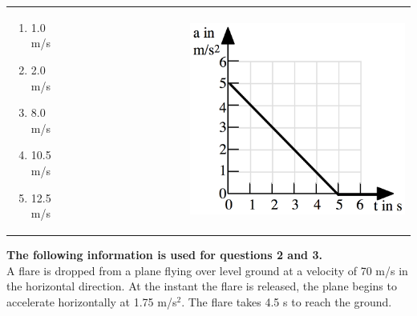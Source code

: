 \documentclass[12pt,letterpaper]{article}
\begin{document}
\begin{enumerate}
\begin{tabular}{l r}
\begin{minipage}{0.575\textwidth}
\begin{enumerate}
\item 1.0 m/s
\item 2.0 m/s
\item 8.0 m/s
\item 10.5 m/s
\item 12.5 m/s
\end{enumerate}
\end{minipage} &
\begin{minipage}{0.4\textwidth}
\includegraphics[width=0.65\textwidth,center]{agraph.png}
\end{minipage}
\end{tabular}
\end{enumerate}

\textbf{The following information is used for questions 2 and 3.}\\
A flare is dropped from a plane flying over level ground at a velocity of 70 m/s in the horizontal direction. At the instant the flare is released, the plane begins to accelerate horizontally at 1.75 m/s$^2$. The flare takes 4.5 s to reach the ground.
\end{document}
